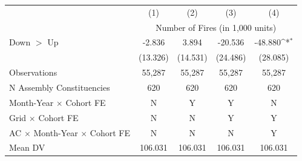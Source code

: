 {
\def\sym#1{\ifmmode^{#1}\else\(^{#1}\)\fi}
\begin{tabular}{l*{4}{c}}
\hline
            &\multicolumn{1}{c}{(1)}         &\multicolumn{1}{c}{(2)}         &\multicolumn{1}{c}{(3)}         &\multicolumn{1}{c}{(4)}         \\
            & \multicolumn{4}{c}{Number of Fires (in 1,000 units)} \\ \hline

Down $>$ Up &      -2.836         &       3.894         &     -20.536         &     -48.880\sym{*}  \\
            &    (13.326)         &    (14.531)         &    (24.486)         &    (28.085)         \\
\hline
Observations&      55,287         &      55,287         &      55,287         &      55,287         \\
N Assembly Constituencies&         620         &         620         &         620         &         620         \\
Month-Year $\times$ Cohort FE&           N         &           Y         &           Y         &           N         \\
Grid $\times$ Cohort FE&           N         &           N         &           Y         &           Y         \\
AC $\times$ Month-Year $\times$ Cohort FE&           N         &           N         &           N         &           Y         \\
Mean DV     &     106.031         &     106.031         &     106.031         &     106.031         \\
\hline
\end{tabular}
}
